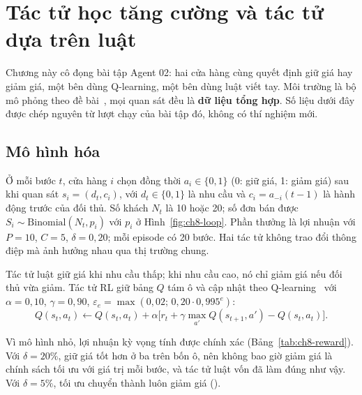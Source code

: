 \chapter{Tác tử học tăng cường và tác tử dựa trên luật}\label{chap:rl}

Chương này cô đọng bài tập Agent 02: hai cửa hàng cùng quyết định giữ giá hay giảm giá, một bên dùng Q-learning, một bên dùng
luật viết tay. Môi trường là bộ mô phỏng theo đề bài~\cite{ch8:lab02}, mọi quan sát đều là \textbf{dữ liệu tổng hợp}. Số liệu dưới đây được chép
nguyên từ lượt chạy của bài tập đó, không có thí nghiệm mới.

\section{Mô hình hóa}

Ở mỗi bước $t$, cửa hàng $i$ chọn đồng thời $a_i\in\{0,1\}$ (0: giữ giá, 1: giảm giá) sau khi quan sát $s_i=(d_t,c_i)$, với
$d_t\in\{0,1\}$ là nhu cầu và $c_i=a_{-i}(t-1)$ là hành động trước của đối thủ. Số khách $N_t$ là 10 hoặc 20; số đơn bán được
$S_i\sim\mathrm{Binomial}(N_t,p_i)$ với $p_i$ ở Hình~\ref{fig:ch8-loop}. Phần thưởng là lợi nhuận với $P=10$, $C=5$, $\delta=0{,}20$; mỗi episode có 20 bước.
Hai tác tử không trao đổi thông điệp mà ảnh hưởng nhau qua thị trường chung.


Tác tử luật giữ giá khi nhu cầu thấp; khi nhu cầu cao, nó chỉ giảm giá nếu đối thủ vừa giảm. Tác tử RL giữ bảng $Q$ tám ô và cập nhật
theo Q-learning~\cite{ch8:watkins1992} với $\alpha=0{,}10$, $\gamma=0{,}90$, $\varepsilon_e=\max(0{,}02;\,0{,}20\cdot0{,}995^e)$:
\begin{equation}\label{eq:ch8-q}
  Q(s_t,a_t)\leftarrow Q(s_t,a_t)+\alpha\bigl[r_t+\gamma\max_{a'}Q(s_{t+1},a')-Q(s_t,a_t)\bigr].
\end{equation}


Vì mô hình nhỏ, lợi nhuận kỳ vọng tính được chính xác (Bảng~\ref{tab:ch8-reward}). Với $\delta=20\%$, giữ giá tốt hơn ở ba trên bốn ô, nên không bao giờ giảm giá là
chính sách tối ưu với giá trị  mỗi bước, và tác tử luật vốn đã làm đúng như vậy. Với $\delta=5\%$, tối ưu chuyển thành luôn giảm giá
().

